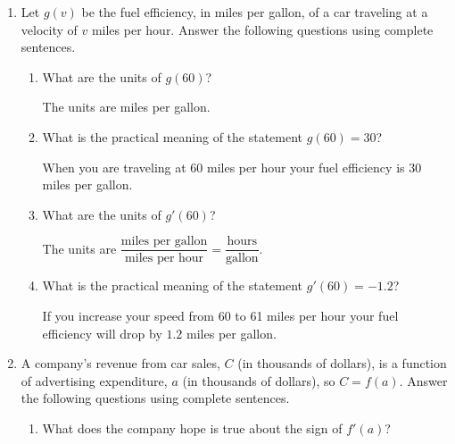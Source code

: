 \documentclass[10pt]{article}
\begin{document}
\drawtitle
\begin{enumerate}
\item Let $g(v)$ be the fuel efficiency, in miles per gallon, of a car
  traveling at a velocity of $v$ miles per hour. Answer the following
  questions using complete sentences.
  \begin{enumerate}
  \item What are the units of $g(60)$?
    
    \vfill

    {\color{blue} The units are miles per gallon.}
    
    \vfill
    
  \item What is the practical meaning of the statement $g(60) = 30$?
    
    \vfill

    {\color{blue} When you are traveling at 60 miles per hour your
      fuel efficiency is 30 miles per gallon.}

    \vfill
    
  \item What are the units of $g'(60)$?
    
    \vfill

    {\color{blue} The units are $\dfrac{\text{miles per
          gallon}}{\text{miles per hour}} =
      \dfrac{\text{hours}}{\text{gallon}}$.}

    \vfill
    
  \item What is the practical meaning of the statement $g'(60) = -1.2$?
    
    \vfill

    {\color{blue} If you increase your speed from 60 to 61 miles per
      hour your fuel efficiency will drop by $1.2$ miles per gallon.}

    \vfill
    
  \end{enumerate}

  \newpage

\item A company's revenue from car sales, $C$ (in thousands of
  dollars), is a function of advertising expenditure, $a$ (in
  thousands of dollars), so $C = f(a)$. Answer the following questions
  using complete sentences.
  \begin{enumerate}
  \item What does the company hope is true about the sign of $f'(a)$?
    
    \vfill


\end{enumerate}
\end{enumerate}
\end{document}

